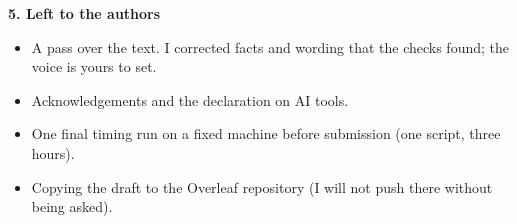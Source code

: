 \documentclass[11pt]{article}
\begin{document}
\textbf{5. Left to the authors}
\begin{itemize}
\item A pass over the text. I corrected facts and wording that the checks found; the voice is yours to set.
\item Acknowledgements and the declaration on AI tools.
\item One final timing run on a fixed machine before submission (one script, three hours).
\item Copying the draft to the Overleaf repository (I will not push there without being asked).
\end{itemize}
\end{document}
